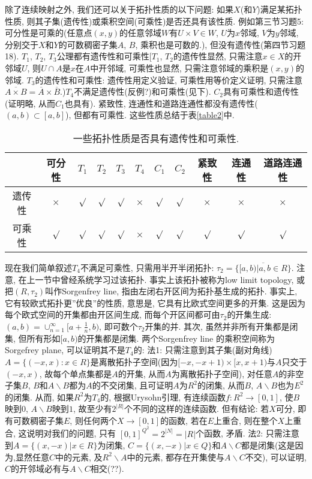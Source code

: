 \documentclass{ctexart}%
\theoremstyle{definition}
\theoremstyle{remark}
\begin{document}
除了连续映射之外, 我们还可以关于拓扑性质的以下问题: 如果$X$(和$Y$)满足某拓扑性质, 则其子集(遗传性)或乘积空间(可乘性)是否还具有该性质. 例如第三节习题5: 可分性是可乘的(任意点$(x,y)$的任意邻域$W$有$U\times V\in W$, $U$为$x$邻域, $V$为$y$邻域, 分别交于$X$和$Y$的可数稠密子集$A$, $B$, 乘积也是可数的.), 但没有遗传性(第四节习题18). $T_1$, $T_2$, $T_3$公理都有遗传性和可乘性[$T_1$, $T_2$的遗传性显然, 只需注意$x\in X$的开邻域$U$, 则$U\cap A$是$x$在$A$中开邻域, 可乘性也显然, 只需注意邻域的乘积是$(x,y)$的邻域. $T_3$的遗传性和可乘性: 遗传性用定义验证, 可乘性用等价定义证明, 只需注意$\overline{A\times B}=\overline{A}\times \overline{B}$.)$T_4$不满足遗传性(反例?)和可乘性(见下). $C_2$具有可乘性和遗传性(证明略, 从而$C_1$也具有). 紧致性, 连通性和道路连通性都没有遗传性($(a,b)\subset[a,b]$), 但都有可乘性. 
这些性质总结于表\ref{table2}中. 
\begin{table}
\centering
\begin{tabular}{|c|c|c|c|c|c|c|c|c|c|c|}
\hline
\hline
       &可分性   & $T_1$  & $T_2$  & $T_3$  &$T_4$   &$C_1$  &$C_2$  & 紧致性 & 连通性 & 道路连通性\\
\hline
遗传性 &$\times$ & $\surd$&$\surd$  &$\surd$ &$\times$&$\surd$&$\surd$&$\times$&$\times$&$\times$\\
\hline
可乘性 &$\surd$  & $\surd$&$\surd$  &$\surd$ &$\times$&$\surd$&$\surd$&$\surd$ &$\surd$ &$\surd$ \\
\hline
\hline
\end{tabular}
\caption{一些拓扑性质是否具有遗传性和可乘性.}
\end{table}

现在我们简单叙述$T_4$不满足可乘性, 只需用半开半闭拓扑: $\tau_2=\overline{\{[a,b)|a,b\in R\}}$. 注意, 在上一节中曾经系统学习过该拓扑. 事实上该拓扑被称为low limit topology, 或把$(R,\tau_2)$叫作Sorgenfrey line, 指由左闭右开区间为拓扑基生成的拓扑. 事实上, 它有较欧式拓扑更''优良''的性质, 意思是, 它具有比欧式空间更多的开集. 这是因为每个欧式空间的开集都由开区间生成, 而每个开区间都可由$\tau_2$的开集生成: $(a,b)
=\cup_{n=1}^\infty[a+\frac{1}{n},b)$, 即可数个$\tau_2$开集的并. 其次, 虽然并非所有开集都是闭集, 但所有形如$[a,b)$的开集都是闭集. 两个Sorgenfrey line 的乘积空间称为Sorgefrey plane, 可以证明其不是$T_4$的: 法1: 只需注意到其子集(副对角线)$A=\{(-x,x):x\in R\}$是离散拓扑子空间(因为$[-x,-x+1)\times[x,x+1)$与$A$只交于$(-x,x)$, 故每个单点集都是$A$的开集, 从而$A$为离散拓扑子空间), 对任意$A$的非空子集$B$, $B$和$A\backslash B$都为$A$的不交闭集, 且可证明$A$为$R^2$的闭集, 从而$B$, $A\backslash B$也为$E^2$的闭集. 从而, 如果$R^2$为$T_4$的, 根据Urysohn引理, 有连续函数$f: R^2\rightarrow [0,1]$, 使$B$映到$0$, $A\backslash B$映到$1$, 故至少有$2^{|R|}$个不同的这样的连续函数. 但有结论: 若$X$可分, 即有可数稠密子集$E$, 则任何两个$X\rightarrow [0,1]$的函数, 若在$E$上重合, 则在整个$X$上重合, 这说明对我们的问题, 只有
$[0,1]^{Q^2}=2^{|N|}=|R|$个函数, 矛盾. 法2: 只需注意到$A=\{(x,-x)|x\in R\}$为闭集, $C=\{(x,-x)|x\in Q\}$和$A\backslash C$都是闭集(这是因为,显然任意$C$中的元素, 及$R^2\backslash A$中的元素, 都存在开集使与$A\backslash C$不交), 可以证明, $C$的开邻域必有与$A\backslash C$相交(??). 
\end{document}
